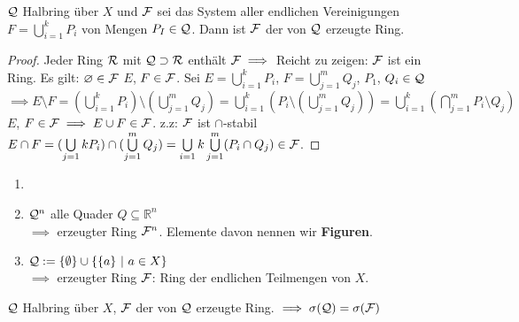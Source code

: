   \begin{theorem}[i.A. II.22]
    $\mathcal{Q}$ Halbring über $X$ und $\mathcal{F}$ sei das System aller endlichen Vereinigungen $F=\bigcup\limits_{i=1}^k P_i$ von Mengen $P_I \in \mathcal{Q}$. Dann ist $\mathcal{F}$ der von $\mathcal{Q}$ erzeugte Ring.
  \end{theorem}

  \begin{proof}
    Jeder Ring $\mathcal{R}$ mit $\mathcal{Q}\supset \mathcal{R}$ enthält $\mathcal{F} \implies$ Reicht zu zeigen: $\mathcal{F}$ ist ein Ring. \newline
    Es gilt: $\varnothing \in \mathcal{F}$ \newline
    $E$, $F \in \mathcal{F}$. Sei $E = \bigcup\limits_{i=1}^{k}P_i$, $F = \bigcup\limits_{j=1}^{m}Q_j$, $P_1$, $Q_i \in \mathcal{Q}$ \newline 
    $\implies E\setminus F = (\bigcup\limits_{i=1}^{k}P_i)\setminus (\bigcup\limits_{j=1}^{m}Q_j) = \bigcup\limits_{i=1}^{k}(P_i\setminus (\bigcup\limits_{j=1}^{m}Q_j)) = \bigcup\limits_{i=1}^{k}(\bigcap\limits_{j=1}^{m}P_i\setminus Q_j)$ \newline
    $E$, $F \in \mathcal{F} \implies E\cup F \in \mathcal{F}$. \newline
    z.z: $\mathcal{F}$ ist $\cap$-stabil \newline
    $E\cap F = (\bigcup\limits_{j=1}{k}P_i)\cap (\bigcup\limits_{j=1}^{m}Q_j) = \bigcup\limits_{i=1}{k} \bigcup\limits_{j=1}^{m}(P_i \cap Q_j) \in \mathcal{F}$. 
  \end{proof}

  \begin{example}
    \begin{enumerate}
      \item[]
      \item $\mathcal{Q}^n$ alle Quader $Q \subseteq \mathbb{R}^n$\\
            $\implies$ erzeugter Ring $\mathcal{F}^n$. Elemente davon nennen wir \textbf{Figuren}. 
      \item $\mathcal{Q} := \{\emptyset\} \cup \{\{a\} \ | \ a \in X\}$\\
            $\implies$ erzeugter Ring $\mathcal{F}$: Ring der endlichen Teilmengen von $X$.
    \end{enumerate}
  \end{example}

  \begin{lemma}[i.A. II.23]
    $\mathcal{Q}$ Halbring über $X$, $\mathcal{F}$ der von $\mathcal{Q}$ erzeugte Ring. $\implies \sigma(\mathcal{Q}) = \sigma(\mathcal{F})$
  \end{lemma}

